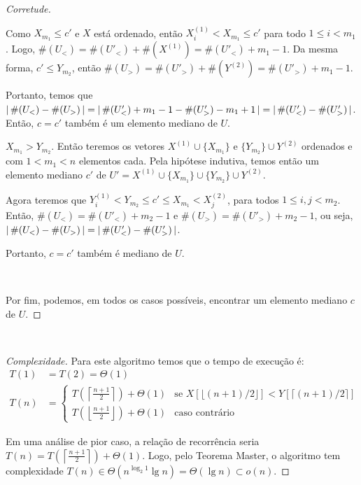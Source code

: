 \begin{proof}[Corretude]
\begin{casos}
\begin{casos}
            Como $X_{m_1} \leq c'$ e $X$ está ordenado, então $X^{(1)}_i < X_{m_1} \leq c'$ para todo $1 \leq i < m_1$. Logo, $\#(U_<) = \#(U'_<) + \#(X^{(1)}) = \#(U'_<) + m_1 - 1$. Da mesma forma, $c' \leq Y_{m_2}$, então $\#(U_>) = \#(U'_>) + \#(Y^{(2)}) = \#(U'_>) + m_1 - 1$.

            Portanto, temos que ${\lvert\,\#(U_<) - \#(U_>)\,\rvert} = {\lvert\,\#(U'_<) + m_1 - 1 - \#(U'_>) - m_1 + 1\,\rvert} = \\ {\lvert\,\#(U'_<) - \#(U'_>)\,\rvert}$. Então, $c = c'$ também é um elemento mediano de $U$.

            \item $X_{m_1} > Y_{m_2}$. Então teremos os vetores $X^{(1)} \cup \{X_{m_1}\}$ e $\{Y_{m_2}\} \cup Y^{(2)}$ ordenados e com $1 < m_1 < n$ elementos cada. Pela hipótese indutiva, temos então um elemento mediano $c'$ de  $U' = X^{(1)} \cup \{X_{m_1}\} \cup \{Y_{m_2}\} \cup Y^{(2)}$.

            Agora teremos que $Y^{(1)}_i < Y_{m_2} \leq c' \leq X_{m_1} < X^{(2)}_j$, para todos $1 \leq i, j < m_2$. Então, $\#(U_<) = \#(U'_<) + m_2 - 1$ e $\#(U_>) = \#(U'_>) + m_2 - 1$, ou seja, ${\lvert\,\#(U_<) - \#(U_>)\,\rvert} = {\lvert\,\#(U'_<) - \#(U'_>)\,\rvert}$.

            Portanto, $c = c'$ também é mediano de $U$.
        \end{casos}
    \end{casos}

    ~

    Por fim, podemos, em todos os casos possíveis, encontrar um elemento mediano $c$ de $U$.
\end{proof}

~

\begin{proof}[Complexidade]
    Para este algoritmo temos que o tempo de execução é:
    \begin{align*}
        T(1) &= T(2) = \Theta(1) \\
        T(n) &= \begin{cases}
            T\left(\left\lceil\frac{n + 1}{2}\right\rceil\right) + \Theta(1)
            & \text{se } X\left[\lfloor(n + 1) / 2\rfloor\right] < Y\left[\lceil(n + 1) / 2\rceil\right] \\
            T\left(\left\lfloor\frac{n + 1}{2}\right\rfloor\right) + \Theta(1)
            & \text{caso contrário}
        \end{cases}
    \end{align*}

    Em uma análise de pior caso, a relação de recorrência seria $T(n) = T\left(\left\lceil\frac{n + 1}{2}\right\rceil\right) + \Theta(1)$. Logo, pelo Teorema Master, o algoritmo tem complexidade $T(n) \in \Theta\left(n^{\log_2 1} \lg n\right) = \Theta(\lg n) \subset o(n)$.
\end{proof}
